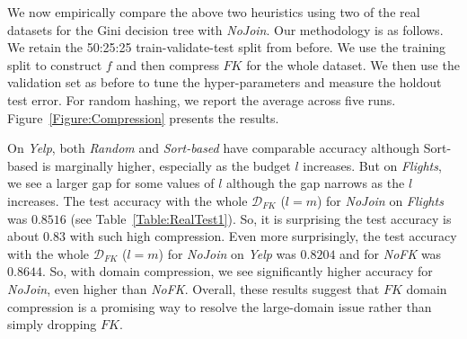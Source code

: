 \documentclass{vldb}
\begin{document}
We now empirically compare the above two heuristics using two of the real datasets for the Gini decision tree with \textit{NoJoin}. Our methodology 
is as follows. We retain the 50:25:25 train-validate-test split from before. We use the training split to construct $f$ and then compress $FK$ for 
the whole dataset. We then use the validation set as before to tune the hyper-parameters and measure the holdout test error. For random hashing, we 
report the average across five runs. Figure~\ref{Figure:Compression} presents the results.

On \textit{Yelp}, both \textit{Random} and \textit{Sort-based} have comparable accuracy although Sort-based is marginally higher, especially
as the budget $l$ increases. But on \textit{Flights}, we see a larger gap for some values of $l$ although the gap narrows as the $l$ increases.
The test accuracy with the whole $\mathcal{D}_{FK}$ ($l=m$) for \textit{NoJoin} on \textit{Flights} was $0.8516$ (see Table~\ref{Table:RealTest1}). So, 
it is surprising the test accuracy is about $0.83$ with such high compression. Even more surprisingly, the test accuracy with the whole 
$\mathcal{D}_{FK}$ ($l=m$) for \textit{NoJoin} on \textit{Yelp} was $0.8204$ and for \textit{NoFK} was $0.8644$. So, with domain compression,
we see significantly higher accuracy for \textit{NoJoin}, even higher than \textit{NoFK}. Overall, these results suggest that $FK$ domain compression 
is a promising way to resolve the large-domain issue rather than simply dropping $FK$.
\end{document}
